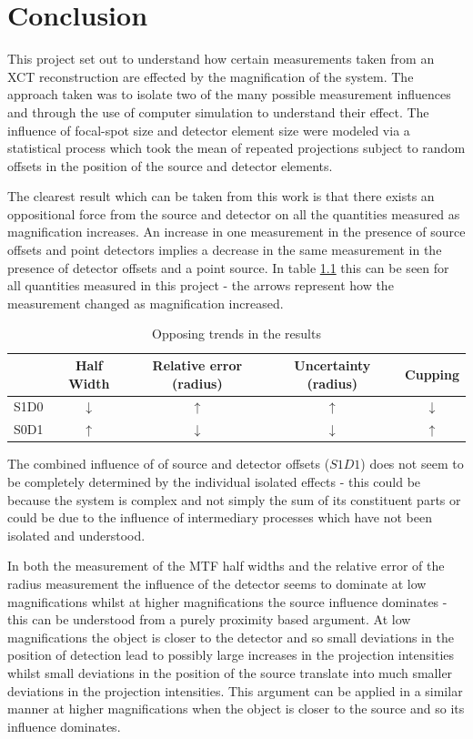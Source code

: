 \documentclass[
  twoside,
  11pt, a4paper,
  footinclude=true,
  headinclude=true,
  cleardoublepage=empty
]{scrbook}
\begin{document}
\chapter{Conclusion}

This project set out to understand how certain measurements taken from an XCT reconstruction are effected by the magnification of the system. The approach taken was to isolate two of the many possible measurement influences and through the use of computer simulation to understand their effect. The influence of focal-spot size and detector element size were modeled via a statistical process which took the mean of repeated projections subject to random offsets in the position of the source and detector elements.

The clearest result which can be taken from this work is that there exists an oppositional force from the source and detector on all the quantities measured as magnification increases. An increase in one measurement in the presence of source offsets and point detectors implies a decrease in the same measurement in the presence of detector offsets and a point source. In table \ref{upsanddowns} this can be seen for all quantities measured in this project - the arrows represent how the measurement changed as magnification increased.

\begin{table}
\caption{Opposing trends in the results}
\label{upsanddowns}
\begin{tabular}{c|cccc}
\toprule
{}  &     Half Width &     Relative error (radius)  &  Uncertainty (radius) &  Cupping\\
\midrule
S1D0     &    $\downarrow$ & $\uparrow$ & $\uparrow$ & $\downarrow$ \\
S0D1     &    $\uparrow$ & $\downarrow$ & $\downarrow$ & $\uparrow$ \\
\bottomrule
\end{tabular}
\end{table}

The combined influence of of source and detector offsets ($S1D1$) does not seem to be completely determined by the individual isolated effects - this could be because the system is complex and not simply the sum of its constituent parts or could be due to the influence of intermediary processes which have not been isolated and understood.

In both the measurement of the MTF half widths and the relative error of the radius measurement the influence of the detector seems to dominate at low magnifications whilst at higher magnifications the source influence dominates - this can be understood from a purely proximity based argument. At low magnifications the object is closer to the detector and so small deviations in the position of detection lead to possibly large increases in the projection intensities whilst small deviations in the position of the source translate into much smaller deviations in the projection intensities. This argument can be applied in a similar manner at higher magnifications when the object is closer to the source and so its influence dominates.
\end{document}
